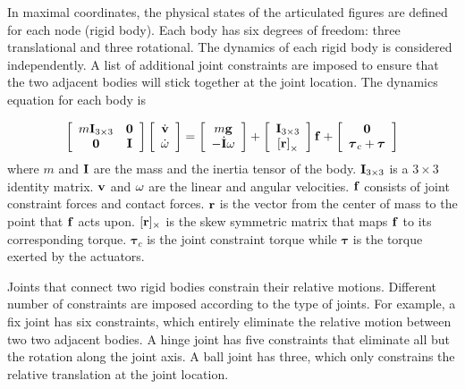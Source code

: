 In maximal coordinates, the physical states of the articulated figures are defined for each node (rigid body). Each body has six degrees of freedom: three translational and three rotational. The dynamics of each rigid body is considered independently. A list of additional joint constraints are imposed to ensure that the two adjacent bodies will stick together at the joint location. The dynamics equation for each body is 

\begin{equation}
\left[\begin{array}{cc}
m\vc{I}_{3\times3} & \vc{0} \\
\vc{0} & \vc{I}
\end{array}\right]
\left[\begin{array}{c}
\dot{\vc{v}} \\
\dot{\vc{\omega}}
\end{array}\right]=
\left[\begin{array}{c}
m\vc{g} \\
-\dot{\vc{I}}\vc{\omega}
\end{array}\right]
+\left[\begin{array}{c}
\vc{I}_{3\times3}\\
\vc{[r]}_\times
\end{array}\right]
\vc{f}+
\left[\begin{array}{c}
\vc{0}\\
\boldsymbol{\tau}_c+\boldsymbol{\tau}
\end{array}\right]
\label{eq:dynamics}
\end{equation}
where $m$ and $\mathbf{I}$ are the mass and the inertia tensor of the body. $\mathbf{I}_{3\times 3}$ is a $3\times 3$ identity matrix. $\mathbf{v}$ and $\mathbf{\omega}$ are the linear and angular velocities. $\mathbf{f}$ consists of joint constraint forces and contact forces. $\mathbf{r}$ is the vector from the center of mass to the point that $\mathbf{f}$ acts upon. $[\mathbf{r}]_{\times}$ is the skew symmetric matrix that maps $\mathbf{f}$ to its corresponding torque. $\boldsymbol{\tau}_c$ is the joint constraint torque while $\boldsymbol{\tau}$ is the torque exerted by the actuators.

Joints that connect two rigid bodies constrain their relative motions. Different number of constraints are imposed according to the type of joints. For example, a fix joint has six constraints, which entirely eliminate the relative motion between two two adjacent bodies. A hinge joint has five constraints that eliminate all but the rotation along the joint axis. A ball joint has three, which only constrains the relative translation at the joint location. 

